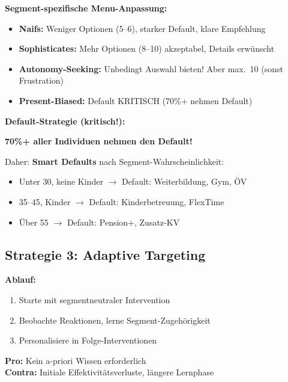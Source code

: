 \textbf{Segment-spezifische Menu-Anpassung:}
\begin{itemize}[nosep]
\item \textbf{Naifs:} Weniger Optionen (5--6), starker Default, klare Empfehlung
\item \textbf{Sophisticates:} Mehr Optionen (8--10) akzeptabel, Details erwünscht
\item \textbf{Autonomy-Seeking:} Unbedingt Auswahl bieten! Aber max.\ 10 (sonst Frustration)
\item \textbf{Present-Biased:} Default KRITISCH (70\%+ nehmen Default)
\end{itemize}

\textbf{Default-Strategie (kritisch!):}

\begin{tcolorbox}[colback=red!5!white, colframe=red!75!black]
\textbf{70\%+ aller Individuen nehmen den Default!}

Daher: \textbf{Smart Defaults} nach Segment-Wahrscheinlichkeit:
\begin{itemize}[nosep]
\item Unter 30, keine Kinder $\rightarrow$ Default: Weiterbildung, Gym, ÖV
\item 35--45, Kinder $\rightarrow$ Default: Kinderbetreuung, FlexTime
\item Über 55 $\rightarrow$ Default: Pension+, Zusatz-KV
\end{itemize}
\end{tcolorbox}

\subsection{Strategie 3: Adaptive Targeting}

\begin{tcolorbox}[colback=blue!5!white, colframe=blue!75!black,
    title=Strategie: Adaptive Targeting]
\textbf{Ablauf:}
\begin{enumerate}[nosep]
\item Starte mit segmentneutraler Intervention
\item Beobachte Reaktionen, lerne Segment-Zugehörigkeit
\item Personalisiere in Folge-Interventionen
\end{enumerate}

\textbf{Pro:} Kein a-priori Wissen erforderlich\\
\textbf{Contra:} Initiale Effektivitätsverluste, längere Lernphase
\end{tcolorbox}

